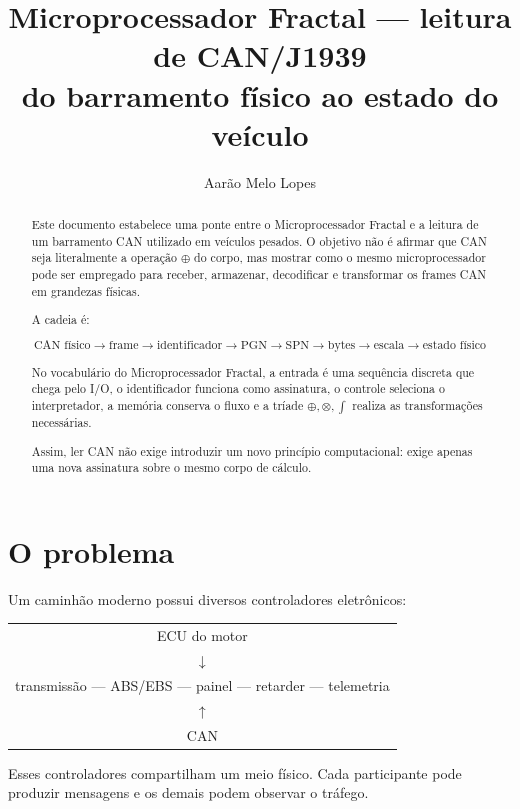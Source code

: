 \documentclass[11pt,a4paper]{article}
\title{\textbf{Microprocessador Fractal --- leitura de CAN/J1939}\\[0.4em]
\large do barramento físico ao estado do veículo}
\author{Aarão Melo Lopes}
\date{}
\begin{document}
\maketitle

\begin{abstract}

Este documento estabelece uma ponte entre o Microprocessador Fractal e a leitura
de um barramento CAN utilizado em veículos pesados. O objetivo não é afirmar que
CAN seja literalmente a operação $\oplus$ do corpo, mas mostrar como o mesmo
microprocessador pode ser empregado para receber, armazenar, decodificar e
transformar os frames CAN em grandezas físicas.

A cadeia é:

\[
\boxed{
\text{CAN físico}
\rightarrow
\text{frame}
\rightarrow
\text{identificador}
\rightarrow
\text{PGN}
\rightarrow
\text{SPN}
\rightarrow
\text{bytes}
\rightarrow
\text{escala}
\rightarrow
\text{estado físico}
}
\]

No vocabulário do Microprocessador Fractal, a entrada é uma sequência discreta
que chega pelo I/O, o identificador funciona como assinatura, o controle seleciona
o interpretador, a memória conserva o fluxo e a tríade $\oplus,\otimes,\int$
realiza as transformações necessárias.

Assim, ler CAN não exige introduzir um novo princípio computacional: exige apenas
uma nova assinatura sobre o mesmo corpo de cálculo.

\end{abstract}


\section{O problema}

Um caminhão moderno possui diversos controladores eletrônicos:

\begin{center}
\begin{tabular}{c}
ECU do motor
\\
$\downarrow$
\\
transmissão --- ABS/EBS --- painel --- retarder --- telemetria
\\
$\uparrow$
\\
CAN
\end{tabular}
\end{center}

Esses controladores compartilham um meio físico. Cada participante pode produzir
mensagens e os demais podem observar o tráfego.
\end{document}
